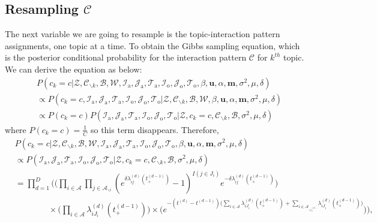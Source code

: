 \documentclass[a4paper]{article}
\begin{document}
 \subsection{Resampling $\mathcal{C}$} \label{subsec: Resampling C}
 The next variable we are going to resample is the topic-interaction pattern assignments, one topic at a time. To obtain the Gibbs sampling equation, which is the posterior conditional probability for the interaction pattern $\mathcal{C}$ for $k^{th}$ topic. We can derive the equation as below:
 \begin{equation}
 \begin{aligned} & P(c_k=c|\mathcal{Z},   \mathcal{C}_{\backslash k},   \mathcal{B},\mathcal{W}, \mathcal{I}_{\mbox{a}}, \mathcal{J}_{\mbox{a}}, \mathcal{T}_{\mbox{a}}, \mathcal{I}_{\mbox{o}}, \mathcal{J}_{\mbox{o}}, \mathcal{T}_{\mbox{o}}, \beta, \boldsymbol{u}, \alpha, \boldsymbol{m}, \sigma^2, \mu, \delta)\\
 &\propto P(c_k=c, \mathcal{I}_{\mbox{a}}, \mathcal{J}_{\mbox{a}}, \mathcal{T}_{\mbox{a}}, \mathcal{I}_{\mbox{o}}, \mathcal{J}_{\mbox{o}}, \mathcal{T}_{\mbox{o}}|\mathcal{Z}, \mathcal{C}_{\backslash k},   \mathcal{B},\mathcal{W}, \beta, \boldsymbol{u}, \alpha, \boldsymbol{m}, \sigma^2, \mu, \delta)\\
& \propto P(c_k=c)P(\mathcal{I}_{\mbox{a}}, \mathcal{J}_{\mbox{a}}, \mathcal{T}_{\mbox{a}}, \mathcal{I}_{\mbox{o}}, \mathcal{J}_{\mbox{o}}, \mathcal{T}_{\mbox{o}}| \mathcal{Z}, c_k=c, \mathcal{C}_{\backslash k}, \mathcal{B}, \sigma^2, \mu, \delta)
 \end{aligned}
 \end{equation}
 where $P(c_k=c) = \frac{1}{C}$ so this term disappears. Therefore, 
 \begin{equation}
 \begin{aligned}
 &P(c_k=c|\mathcal{Z},   \mathcal{C}_{\backslash k},   \mathcal{B},\mathcal{W}, \mathcal{I}_{\mbox{a}}, \mathcal{J}_{\mbox{a}}, \mathcal{T}_{\mbox{a}}, \mathcal{I}_{\mbox{o}}, \mathcal{J}_{\mbox{o}}, \mathcal{T}_{\mbox{o}}, \beta, \boldsymbol{u}, \alpha, \boldsymbol{m}, \sigma^2, \mu, \delta)\\&\propto P(\mathcal{I}_{\mbox{a}}, \mathcal{J}_{\mbox{a}}, \mathcal{T}_{\mbox{a}}, \mathcal{I}_{\mbox{o}}, \mathcal{J}_{\mbox{o}}, \mathcal{T}_{\mbox{o}}| \mathcal{Z}, c_k=c, \mathcal{C}_{\backslash k}, \mathcal{B}, \sigma^2, \mu, \delta)\\&=\prod_{d=1}^D\Bigg(\Big(\prod_{i\in \mathcal{A}}\prod_{j \in \mathcal{A}_{\backslash i }} (e^{\delta\lambda^{(d)}_{ij}(t_+^{(d-1)})}-1)^{I(j \in J_i)}e^{-\delta\lambda^{(d)}_{ij}(t_+^{(d-1)})}\Big)\\&\quad\quad\quad\quad \times \Big(\prod_{i\in \mathcal{A}} \lambda^{(d)}_{iJ_i}(t_+^{(d-1)})\Big)\times \Big(e^{-(t^{(d)}-t^{(d-1)})\big(\sum\limits_{i \in \mathcal{A}}\lambda^{(d)}_{i{J_i}}(t_+^{(d-1)})+\sum\limits_{i \in \mathcal{A}_{\backslash i_o^{(d)}}}\lambda^{(d)}_{i{J_i}}(t_+^{(d-1)})\big)}\Big)\bigg),
 \end{aligned}
 \end{equation} 
\end{document}
